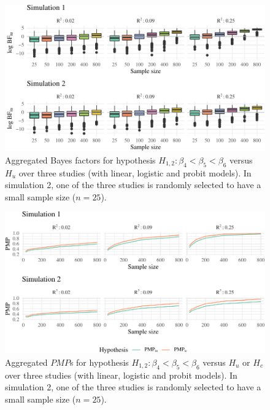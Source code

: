 \documentclass[review, 3p, authoryear]{elsarticle} %
\begin{document}
\begin{figure}
\includegraphics[width=1\linewidth]{manuscript_volker_files/figure-latex/BF12-1} \caption{Aggregated Bayes factors for hypothesis $H_{1,2}: \beta_4 < \beta_5 < \beta_6$ versus $H_u$ over three studies (with linear, logistic and probit models). In simulation 2, one of the three studies is randomly selected to have a small sample size ($n = 25$).}\label{fig:BF12}
\end{figure}

\begin{figure}
\includegraphics[width=1\linewidth]{manuscript_volker_files/figure-latex/PMP12-1} \caption{Aggregated $PMP$s for hypothesis $H_{1,2}: \beta_4 < \beta_5 < \beta_6$ versus $H_u$ or $H_c$ over three studies (with linear, logistic and probit models). In simulation 2, one of the three studies is randomly selected to have a small sample size ($n = 25$).}\label{fig:PMP12}
\end{figure}
\end{document}
